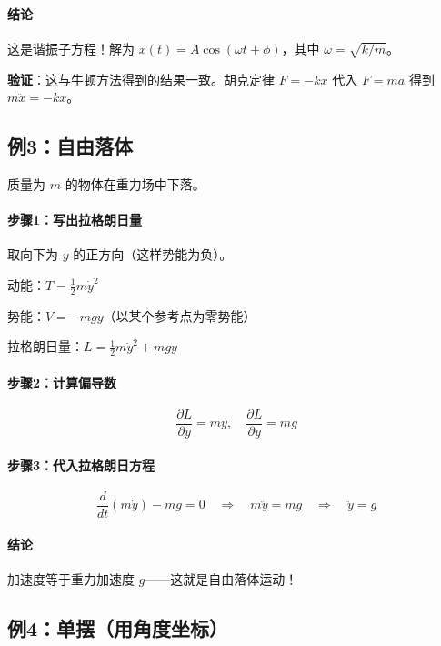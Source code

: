 \paragraph{结论}

这是谐振子方程！解为 $x(t) = A\cos(\omega t + \phi)$，其中 $\omega = \sqrt{k/m}$。

\textbf{验证}：这与牛顿方法得到的结果一致。胡克定律 $F = -kx$ 代入 $F = ma$ 得到 $m\ddot{x} = -kx$。

\subsection{例3：自由落体}

质量为 $m$ 的物体在重力场中下落。

\paragraph{步骤1：写出拉格朗日量}

取向下为 $y$ 的正方向（这样势能为负）。

动能：$T = \frac{1}{2}m\dot{y}^2$

势能：$V = -mgy$（以某个参考点为零势能）

拉格朗日量：$L = \frac{1}{2}m\dot{y}^2 + mgy$

\paragraph{步骤2：计算偏导数}

\[
\frac{\partial L}{\partial \dot{y}} = m\dot{y}, \quad \frac{\partial L}{\partial y} = mg
\]

\paragraph{步骤3：代入拉格朗日方程}

\[
\frac{d}{dt}(m\dot{y}) - mg = 0 \quad \Rightarrow \quad m\ddot{y} = mg \quad \Rightarrow \quad \ddot{y} = g
\]

\paragraph{结论}

加速度等于重力加速度 $g$——这就是自由落体运动！

\subsection{例4：单摆（用角度坐标）}

